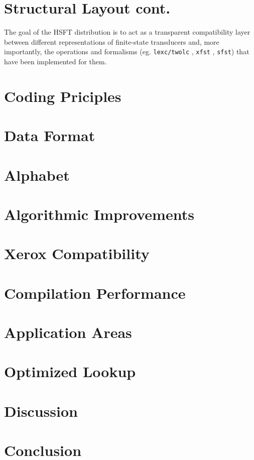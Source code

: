 \documentclass{llncs}
\begin{document}
\section*{Structural Layout cont.}
The goal of the HSFT distribution is to act as a transparent compatibility
layer between different representations of finite-state transducers and,
more importantly, the operations and formalisms (eg.
\verb+lexc/twolc+ , \verb+xfst+ , \verb+sfst+) that have been implemented
for them.

\section*{Coding Priciples}


\section*{Data Format}

\section*{Alphabet}

\section*{Algorithmic Improvements}

\section*{Xerox Compatibility}

\section*{Compilation Performance}

\section*{Application Areas}

\section*{Optimized Lookup}

\section*{Discussion}

\section*{Conclusion}

%
%
%
%
\begin{thebibliography}{}

\end{thebibliography}
\end{document}

